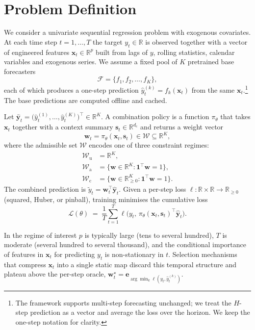 \documentclass[journal]{IEEEtran}
\begin{document}
\section{Problem Definition}
\label{sec:problem}

We consider a univariate sequential regression problem with exogenous covariates. At each time step $t = 1,\dots,T$ the target $y_t \in \mathbb{R}$ is observed together with a vector of engineered features $\mathbf{x}_t \in \mathbb{R}^p$ built from lags of $y$, rolling statistics, calendar variables and exogenous series. We assume a fixed pool of $K$ pretrained base forecasters
\[
\mathcal{F} = \{f_1, f_2, \dots, f_K\},
\]
each of which produces a one-step prediction $\hat{y}^{(k)}_t = f_k(\mathbf{x}_t)$ from the same $\mathbf{x}_t$.\footnote{The framework supports multi-step forecasting unchanged; we treat the $H$-step prediction as a vector and average the loss over the horizon. We keep the one-step notation for clarity.} The base predictions are computed offline and cached.

Let $\boldsymbol{\hat{y}}_t = \bigl(\hat{y}^{(1)}_t,\dots,\hat{y}^{(K)}_t\bigr)^\top \in \mathbb{R}^K$. A combination policy is a function $\pi_\theta$ that takes $\mathbf{x}_t$ together with a context summary $\mathbf{s}_t \in \mathbb{R}^{d_c}$ and returns a weight vector
\[
\mathbf{w}_t = \pi_\theta(\mathbf{x}_t, \mathbf{s}_t) \in \mathcal{W} \subseteq \mathbb{R}^K,
\]
where the admissible set $\mathcal{W}$ encodes one of three constraint regimes:
\begin{align}
\mathcal{W}_{\mathrm{u}}      &= \mathbb{R}^K,\\
\mathcal{W}_{\mathrm{a}}      &= \{\mathbf{w} \in \mathbb{R}^K : \mathbf{1}^\top \mathbf{w} = 1\},\\
\mathcal{W}_{\mathrm{c}}      &= \{\mathbf{w} \in \mathbb{R}^K_{\ge 0} : \mathbf{1}^\top \mathbf{w} = 1\}.
\end{align}
The combined prediction is $\tilde{y}_t = \mathbf{w}_t^\top \boldsymbol{\hat{y}}_t$. Given a per-step loss $\ell : \mathbb{R} \times \mathbb{R} \to \mathbb{R}_{\ge 0}$ (squared, Huber, or pinball), training minimises the cumulative loss
\begin{equation}
\label{eq:cumloss}
\mathcal{L}(\theta) \;=\; \frac{1}{T} \sum_{t=1}^{T} \ell\!\bigl(y_t,\, \pi_\theta(\mathbf{x}_t, \mathbf{s}_t)^\top \boldsymbol{\hat{y}}_t\bigr).
\end{equation}

In the regime of interest $p$ is typically large (tens to several hundred), $T$ is moderate (several hundred to several thousand), and the conditional importance of features in $\mathbf{x}_t$ for predicting $y_t$ is non-stationary in $t$. Selection mechanisms that compress $\mathbf{x}_t$ into a single static map discard this temporal structure and plateau above the per-step oracle, $\mathbf{w}_t^\star = \mathbf{e}_{\arg\min_k \ell(y_t,\hat{y}^{(k)}_t)}$.
\end{document}
